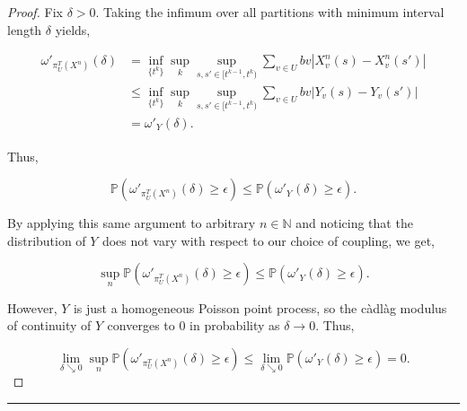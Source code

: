 \documentclass[12pt]{article}
\newcommand{\mb}{\mathbb}
\newcommand{\ra}{\rightarrow}
\newcommand{\ep}{\epsilon}
\newcommand{\lin}{\rule{\linewidth}{0.4 pt}}
\newcommand{\pr}{\mb{P}}							%
\renewcommand{\v}{v}							%
\renewcommand{\U}{U}							%
\renewcommand{\b}{b}							%
\newcommand{\T}{T}								%
\renewcommand{\t}{t}							%
\renewcommand{\tt}{s}							%
\newcommand{\ttt}{s'}							%
\newcommand{\pup}[1]{^{#1}}							%
\renewcommand{\it}{k}								%
\newcommand{\numb}{n}								%
\newcommand{\piV}[2]{\pi_{#1}^{#2}}					%
\newcommand{\rxvtn}[3]{X_{#1}^{#3}(#2)}				%
\newcommand{\rxvtt}[2]{Y_{#1}{(#2)}}				%
\newcommand{\rxvtsn}[3]{X_{#1}^{#3}{#2}}			%
\newcommand{\rxvtts}[2]{Y_{#1}{#2}}					%
\begin{document}
\begin{proof}
Fix \(\delta > 0\). Taking the infimum over all partitions with minimum interval length \(\delta\) yields,

\begin{align*}
\omega'_{\piV{\U}{\T}\left(\rxvtsn{}{}{\numb}\right)}(\delta) &= \inf_{\{\t\pup{\it}\}}\sup_\it\sup_{\tt,\ttt \in [\t\pup{\it-1},\t\pup{\it})} \sum_{\v\in \U} \b{\v}|\rxvtn{\v}{\tt}{\numb} - \rxvtn{\v}{\ttt}{\numb}|\\
&\leq \inf_{\{\t\pup{\it}\}}\sup_\it\sup_{\tt,\ttt \in [\t\pup{\it-1},\t\pup{\it})} \sum_{\v\in \U} \b{\v}|\rxvtt{\v}{\tt} - \rxvtt{\v}{\ttt}|\\
&= \omega'_{\rxvtts{}{}}(\delta).
\end{align*}

Thus,

\[\pr\left(\omega'_{\piV{\U}{\T}\left(\rxvtsn{}{}{\numb}\right)}(\delta) \geq \ep\right) \leq \pr\left(\omega'_{\rxvtts{}{}}(\delta) \geq \ep\right).\]

By applying this same argument to arbitrary \(\numb\in \mb{N}\) and noticing that the distribution of \(\rxvtts{}{}\) does not vary with respect to our choice of coupling, we get,

\[\sup_{\numb}\pr\left(\omega'_{\piV{\U}{\T}\left(\rxvtsn{}{}{\numb}\right)}(\delta)\geq \ep\right) \leq \pr\left(\omega'_{\rxvtts{}{}}(\delta) \geq \ep\right).\]

However, \(\rxvtts{}{}\) is just a homogeneous Poisson point process, so the c\`adl\`ag modulus of continuity of \(\rxvtts{}{}\) converges to 0 in probability as \(\delta \ra 0\). Thus,

\[\lim_{\delta \searrow 0}\sup_{\numb}\pr\left(\omega'_{\piV{\U}{\T}\left(\rxvtsn{}{}{\numb}\right)}(\delta) \geq \ep\right) \leq \lim_{\delta\searrow 0}\pr\left(\omega'_{\rxvtts{}{}}(\delta)\geq \ep\right) = 0.\]


\end{proof}

\lin
\end{document}

